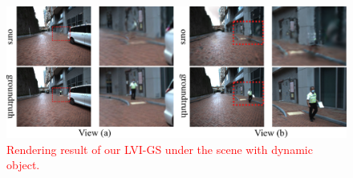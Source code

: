 \documentclass[lettersize,journal]{IEEEtran}
\begin{document}
\begin{figure}
    \centering
    \includegraphics[width=2.0\columnwidth]{image/dynamic/dynamic.pdf} %
    \caption{\textcolor{red}{
      Rendering result of our LVI-GS under the scene with dynamic object.
    }}
    \label{fig:dynamic}
    \vspace{-1.0em}%
\end{figure}
\end{document}
